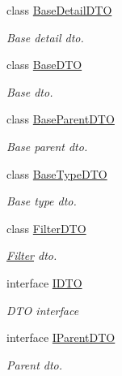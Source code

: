 \begin{DoxyCompactItemize}
\item 
class \mbox{\hyperlink{class_bar_none_1_1_shared_1_1_data_transfer_1_1_core_1_1_base_detail_d_t_o}{Base\+Detail\+D\+TO}}
\begin{DoxyCompactList}\small\item\em Base detail dto. \end{DoxyCompactList}\item 
class \mbox{\hyperlink{class_bar_none_1_1_shared_1_1_data_transfer_1_1_core_1_1_base_d_t_o}{Base\+D\+TO}}
\begin{DoxyCompactList}\small\item\em Base dto. \end{DoxyCompactList}\item 
class \mbox{\hyperlink{class_bar_none_1_1_shared_1_1_data_transfer_1_1_core_1_1_base_parent_d_t_o}{Base\+Parent\+D\+TO}}
\begin{DoxyCompactList}\small\item\em Base parent dto. \end{DoxyCompactList}\item 
class \mbox{\hyperlink{class_bar_none_1_1_shared_1_1_data_transfer_1_1_core_1_1_base_type_d_t_o}{Base\+Type\+D\+TO}}
\begin{DoxyCompactList}\small\item\em Base type dto. \end{DoxyCompactList}\item 
class \mbox{\hyperlink{class_bar_none_1_1_shared_1_1_data_transfer_1_1_core_1_1_filter_d_t_o}{Filter\+D\+TO}}
\begin{DoxyCompactList}\small\item\em \mbox{\hyperlink{namespace_bar_none_1_1_shared_1_1_data_transfer_1_1_core_1_1_filter}{Filter}} dto. \end{DoxyCompactList}\item 
interface \mbox{\hyperlink{interface_bar_none_1_1_shared_1_1_data_transfer_1_1_core_1_1_i_d_t_o}{I\+D\+TO}}
\begin{DoxyCompactList}\small\item\em D\+TO interface \end{DoxyCompactList}\item 
interface \mbox{\hyperlink{interface_bar_none_1_1_shared_1_1_data_transfer_1_1_core_1_1_i_parent_d_t_o}{I\+Parent\+D\+TO}}
\begin{DoxyCompactList}\small\item\em Parent dto. \end{DoxyCompactList}\end{DoxyCompactItemize}
